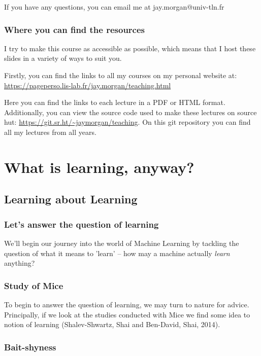 \documentclass[10pt]{beamer}
\begin{document}
If you have any questions, you can email me at jay.morgan@univ-tln.fr

\subsubsection*{Where you can find the resources}
\label{sec:org4ba8f87}

I try to make this course as accessible as possible, which means that I host these
slides in a variety of ways to suit you.

Firstly, you can find the links to all my courses on my personal website at:
\url{https://pageperso.lis-lab.fr/jay.morgan/teaching.html}

Here you can find the links to each lecture in a PDF or HTML format. Additionally,
you can view the source code used to make these lectures on source hut:
\url{https://git.sr.ht/\~jaymorgan/teaching}. On this git repository you can find all my
lectures from all years.

\section*{What is learning, anyway?}
\label{sec:orge164d80}

\subsection*{Learning about Learning}
\label{sec:org913c2e9}

\subsubsection*{Let's answer the question of learning}
\label{sec:org8bbb170}

We'll begin our journey into the world of Machine Learning by tackling the question
of what it means to 'learn' -- how may a machine actually \emph{learn} anything?

\subsubsection*{Study of Mice}
\label{sec:org128b4e7}

To begin to answer the question of learning, we may turn to nature for
advice. Principally, if we look at the studies conducted with Mice we find some idea
to notion of learning (Shalev-Shwartz, Shai and Ben-David, Shai, 2014).

\subsubsection*{Bait-shyness}
\label{sec:org32def20}
\end{document}
